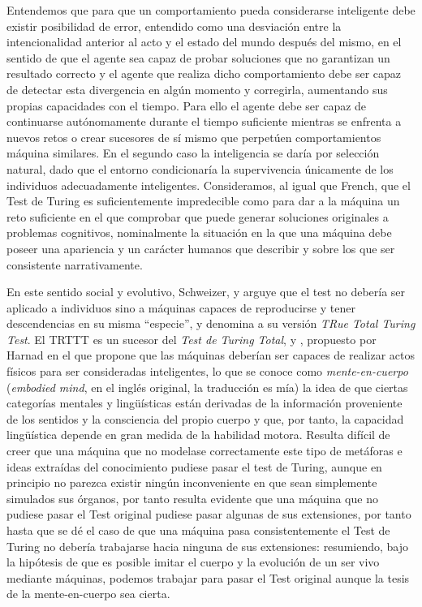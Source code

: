 \documentclass[12pt]{memoir}
\begin{document}
Entendemos que para que un comportamiento pueda considerarse inteligente debe existir posibilidad de error, entendido como una desviación entre la intencionalidad anterior al acto y  el estado del mundo después del mismo, en el sentido de que el agente sea capaz de probar soluciones que no garantizan un resultado correcto y el agente que realiza dicho comportamiento debe ser capaz de detectar esta divergencia en algún momento y corregirla, aumentando sus propias capacidades con el tiempo. Para ello el agente debe ser capaz de continuarse autónomamente durante el tiempo suficiente mientras se enfrenta a nuevos retos o crear sucesores de sí mismo que perpetúen comportamientos máquina similares. En el segundo caso la inteligencia se daría por selección natural, dado que el entorno condicionaría la supervivencia únicamente de los individuos adecuadamente inteligentes. Consideramos, al igual que French, que el Test de Turing es suficientemente impredecible como para dar a la máquina un reto suficiente en el que comprobar que puede generar soluciones originales a problemas cognitivos, nominalmente la situación en la que una máquina debe poseer una apariencia y un carácter humanos que describir y sobre los que ser consistente narrativamente.

En este sentido social y evolutivo, Schweizer, \parencite[apartado 4.4.4]{afterTuring} y \parencite[apartado 5.3.3]{sep-turing-test} arguye que el test no debería ser aplicado a individuos sino a máquinas capaces de reproducirse y tener descendencias en su misma ``especie'', y denomina a su versión \textit{TRue Total Turing Test}. El TRTTT es un sucesor del \textit{Test de Turing Total}, \parencite[apartado 4.4.1]{afterTuring} y \parencite[apartado 5.3.1]{sep-turing-test}, propuesto por Harnad en el que propone que las máquinas deberían ser capaces de realizar actos físicos para ser consideradas inteligentes, lo que se conoce como \textit{mente-en-cuerpo} (\textit{embodied mind}, en el inglés original, la traducción es mía) la idea de que ciertas categorías mentales y lingüísticas están derivadas de la información proveniente de los sentidos y la consciencia del propio cuerpo \parencite{lakoffEmbodiedCognition} y que, por tanto, la capacidad lingüística depende en gran medida de la habilidad motora. Resulta difícil de creer que una máquina que no modelase correctamente este tipo de metáforas e ideas extraídas del conocimiento pudiese pasar el test de Turing, aunque en principio no parezca existir ningún inconveniente en que sean simplemente simulados sus órganos, por tanto resulta evidente que una máquina que no pudiese pasar el Test original pudiese pasar algunas de sus extensiones, por tanto hasta que se dé el caso de que una máquina pasa consistentemente el Test de Turing no debería trabajarse hacia ninguna de sus extensiones: resumiendo, bajo la hipótesis de que es posible imitar el cuerpo y la evolución de un ser vivo mediante máquinas, podemos trabajar para pasar el Test original aunque la tesis de la mente-en-cuerpo sea cierta.
\end{document}
